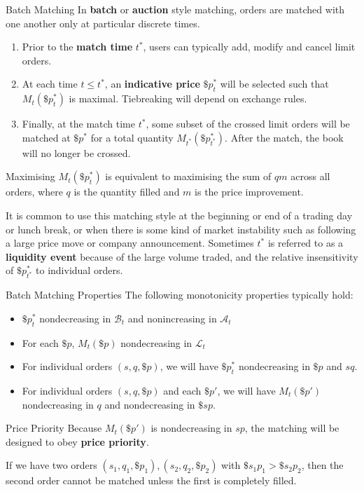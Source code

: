 \documentclass{beamer}
\begin{document}
\begin{frame}{Batch Matching}
	In \textbf{batch} or \textbf{auction} style matching, orders are matched with one another only at particular discrete times.

	\pause

	\begin{enumerate}
		\item Prior to the \textbf{match time} $t^*$, users can typically add, modify and cancel limit orders.
		\item At each time $t\leq t^*$, an \textbf{indicative price} $\$p^*_t$ will be selected such that $M_t(\$p^*_t)$ is maximal. Tiebreaking will depend on exchange rules.
		\item Finally, at the match time $t^*$, some subset of the crossed limit orders will be matched at $\$p^*$ for a total quantity $M_{t^*}(\$p^*_{t^*})$. After the match, the book will no longer be crossed.
	\end{enumerate}

	\pause

	Maximising $M_t(\$p^*_t)$ is equivalent to maximising the sum of $qm$ across all orders, where $q$ is the quantity filled and $m$ is the price improvement.%

	It is common to use this matching style at the beginning or end of a trading day or lunch break, or when there is some kind of market instability such as following a large price move or company announcement. Sometimes $t^*$ is referred to as a \textbf{liquidity event} because of the large volume traded, and the relative insensitivity of $\$p^*_{t^*}$ to individual orders.%
\end{frame}

\begin{frame}{Batch Matching Properties}
	The following monotonicity properties typically hold:
	\begin{itemize}
		\item $\$p^*_t$ nondecreasing in $\mathcal{B}_t$ and nonincreasing in $\mathcal{A}_t$
		\item For each $\$p$, $M_t(\$p)$ nondecreasing in $\mathcal{L}_t$
		\item For individual orders $(s,q,\$p)$, we will have $\$p^*_t$ nondecreasing in $\$p$ and $sq$. %
		\item For individual orders $(s,q,\$p)$ and each $\$p'$, we will have $M_t(\$p')$ nondecreasing in $q$ and nondecreasing in $\$sp$.
	\end{itemize}

	\pause

	\begin{block}{Price Priority}
		Because $M_t(\$p')$ is nondecreasing in $sp$, the matching will be designed to obey \textbf{price priority}.
	
		If we have two orders $(s_1,q_1,\$p_1), (s_2,q_2,\$p_2)$ with $\$s_1p_1 > \$s_2p_2$, then the second order cannot be matched unless the first is completely filled.
	\end{block}
\end{frame}
\end{document}
